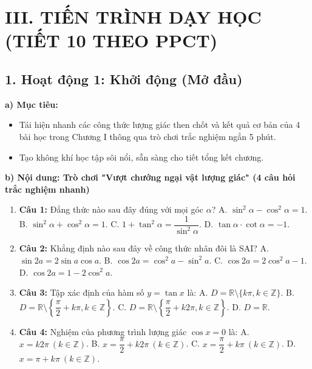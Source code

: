 \documentclass[12pt, a4paper]{article}
\begin{document}
\section*{III. TIẾN TRÌNH DẠY HỌC (TIẾT 10 THEO PPCT)}  
  
\subsection*{1. Hoạt động 1: Khởi động (Mở đầu)}  
  
\noindent \textbf{a) Mục tiêu:}  
\begin{itemize}[leftmargin=0.8cm]  
    \item Tái hiện nhanh các công thức lượng giác then chốt và kết quả cơ bản của 4 bài học trong Chương I thông qua trò chơi trắc nghiệm ngắn 5 phút.  
    \item Tạo không khí học tập sôi nổi, sẵn sàng cho tiết tổng kết chương.  
\end{itemize}  
  
\noindent \textbf{b) Nội dung: Trò chơi "Vượt chướng ngại vật lượng giác" (4 câu hỏi trắc nghiệm nhanh)}  
\begin{enumerate}[leftmargin=0.6cm]  
    \item \textbf{Câu 1:} Đẳng thức nào sau đây đúng với mọi góc $\alpha$?  
    A. $\sin^2\alpha - \cos^2\alpha = 1$. \quad B. $\sin^2\alpha + \cos^2\alpha = 1$. \quad C. $1 + \tan^2\alpha = \dfrac{1}{\sin^2\alpha}$. \quad D. $\tan\alpha \cdot \cot\alpha = -1$.  
    \item \textbf{Câu 2:} Khẳng định nào sau đây về công thức nhân đôi là SAI?  
    A. $\sin 2a = 2\sin a \cos a$. \quad B. $\cos 2a = \cos^2 a - \sin^2 a$. \quad C. $\cos 2a = 2\cos^2 a - 1$. \quad D. $\cos 2a = 1 - 2\cos^2 a$.  
    \item \textbf{Câu 3:} Tập xác định của hàm số $y = \tan x$ là:  
    A. $D = \mathbb{R} \setminus \{k\pi, k \in \mathbb{Z}\}$. \qquad B. $D = \mathbb{R} \setminus \left\{\dfrac{\pi}{2} + k\pi, k \in \mathbb{Z}\right\}$.  
    C. $D = \mathbb{R} \setminus \left\{\dfrac{\pi}{2} + k2\pi, k \in \mathbb{Z}\right\}$. \quad D. $D = \mathbb{R}$.  
    \item \textbf{Câu 4:} Nghiệm của phương trình lượng giác $\cos x = 0$ là:  
    A. $x = k2\pi \ (k \in \mathbb{Z})$. \qquad B. $x = \dfrac{\pi}{2} + k2\pi \ (k \in \mathbb{Z})$.  
    C. $x = \dfrac{\pi}{2} + k\pi \ (k \in \mathbb{Z})$. \qquad D. $x = \pi + k\pi \ (k \in \mathbb{Z})$.  
\end{enumerate}  
  
\end{document}
